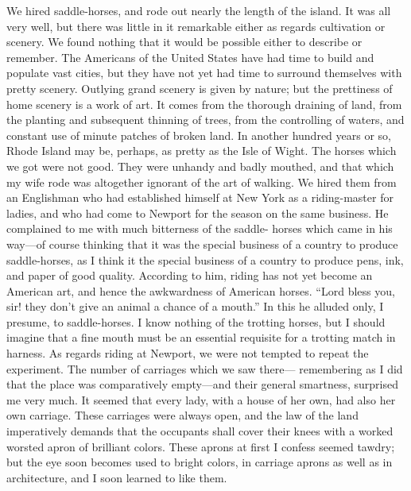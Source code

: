 We hired saddle-horses, and rode out nearly the length of the
island.  It was all very well, but there was little in it
remarkable either as regards cultivation or scenery.  We found
nothing that it would be possible either to describe or remember.
The Americans of the United States have had time to build and
populate vast cities, but they have not yet had time to surround
themselves with pretty scenery.  Outlying grand scenery is given by
nature; but the prettiness of home scenery is a work of art.  It
comes from the thorough draining of land, from the planting and
subsequent thinning of trees, from the controlling of waters, and
constant use of minute patches of broken land.  In another hundred
years or so, Rhode Island may be, perhaps, as pretty as the Isle of
Wight.  The horses which we got were not good.  They were unhandy
and badly mouthed, and that which my wife rode was altogether
ignorant of the art of walking.  We hired them from an Englishman
who had established himself at New York as a riding-master for
ladies, and who had come to Newport for the season on the same
business.  He complained to me with much bitterness of the saddle-
horses which came in his way---of course thinking that it was the
special business of a country to produce saddle-horses, as I think
it the special business of a country to produce pens, ink, and
paper of good quality.  According to him, riding has not yet become
an American art, and hence the awkwardness of American horses.
``Lord bless you, sir! they don't give an animal a chance of a
mouth.''  In this he alluded only, I presume, to saddle-horses.  I
know nothing of the trotting horses, but I should imagine that a
fine mouth must be an essential requisite for a trotting match in
harness.  As regards riding at Newport, we were not tempted to
repeat the experiment.  The number of carriages which we saw there---%
remembering as I did that the place was comparatively empty---and
their general smartness, surprised me very much.  It seemed that
every lady, with a house of her own, had also her own carriage.
These carriages were always open, and the law of the land
imperatively demands that the occupants shall cover their knees
with a worked worsted apron of brilliant colors.  These aprons at
first I confess seemed tawdry; but the eye soon becomes used to
bright colors, in carriage aprons as well as in architecture, and I
soon learned to like them.

